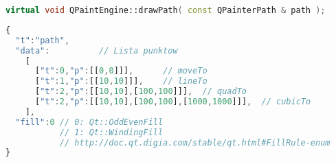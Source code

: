 \begin{lstlisting}[language=C++,numbers=none]
virtual void QPaintEngine::drawPath( const QPainterPath & path );
\end{lstlisting}
\begin{lstlisting}[language=JavaScript,numbers=none]
{
  "t":"path",
  "data":          // Lista punktow
    [
      ["t":0,"p":[[0,0]]],      // moveTo
      ["t":1,"p":[[10,10]]],    // lineTo
      ["t":2,"p":[[10,10],[100,100]]],  // quadTo
      ["t":2,"p":[[10,10],[100,100],[1000,1000]]],  // cubicTo
    ],
  "fill":0 // 0: Qt::OddEvenFill
           // 1: Qt::WindingFill
           // http://doc.qt.digia.com/stable/qt.html#FillRule-enum
}
\end{lstlisting}